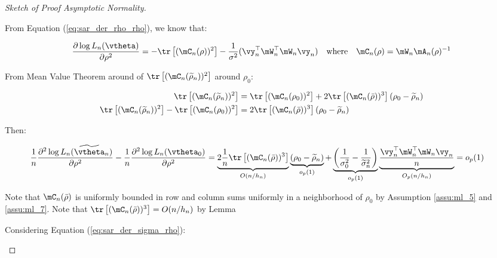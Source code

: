 \documentclass[english,12pt]{book}\usepackage[]{graphicx}\usepackage[]{xcolor}
\begin{document}
\begin{proof}[Sketch of Proof Asymptotic Normality]
\begin{enumerate}
   From Equation (\ref{eq:sar_der_rho_rho}), we know that:
   
   \begin{equation*}
   \frac{\partial \log L_n(\vtheta) }{\partial \rho ^2} = - \tr\left[(\mC_n(\rho))^2\right] - \frac{1}{\sigma^2}(\vy_n^{\top}\mW^{\top}_n\mW_n\vy_n)\quad \mbox{where}\quad \mC_n(\rho) = \mW_n\mA_n(\rho)^{-1}
   \end{equation*}
   
   From Mean Value Theorem around of  $\tr\left[(\mC_n(\widetilde{\rho}_n))^2\right]$ around $\rho_0$:
   
   \begin{equation*}
    \begin{aligned}
    \tr\left[(\mC_n(\widetilde{\rho}_n))^2\right] & = \tr\left[(\mC_n(\rho_0))^2\right]+ 2\tr\left[(\mC_n(\bar{\rho}))^3\right](\rho_0 - \widetilde{\rho}_n) \\
    \tr\left[(\mC_n(\widetilde{\rho}_n))^2\right] - \tr\left[(\mC_n(\rho_0))^2\right] & = 2\tr\left[(\mC_n(\bar{\rho}))^3\right](\rho_0 - \widetilde{\rho}_n)
    \end{aligned}
   \end{equation*}
   
   Then:
   
   \begin{equation*}
    \begin{aligned}
    \frac{1}{n}\frac{\partial^2 \log L_n(\widetilde{\vtheta}_n)}{\partial \rho^2} - \frac{1}{n}\frac{\partial^2 \log L_n(\vtheta_0)}{\partial\rho^2} & = \underbrace{2\frac{1}{n}\tr\left[(\mC_n(\bar{\rho}))^3\right]}_{O(n/h_n)} \underbrace{(\rho_0 - \widetilde{\rho}_n)}_{o_p(1)} + \underbrace{\left(\frac{1}{\sigma^2_0} - \frac{1}{\widetilde{\sigma}^2_n}\right)}_{o_p(1)}\underbrace{\frac{\vy_n^{\top}\mW^{\top}_n\mW_n\vy_n}{n}}_{O_p(n/h_n)} = o_p(1)
    \end{aligned}
   \end{equation*}
   
   Note that $\mC_n(\bar{\rho})$ is uniformly bounded in row and column sums uniformly in a neighborhood of $\rho_0$ by  Assumption \ref{assu:ml_5} and \ref{assu:ml_7}. Note that $\tr\left[(\mC_n(\bar{\rho}))^3\right] = O(n/h_n)$ by Lemma 
   
  Considering Equation (\ref{eq:sar_der_sigma_rho}):
   

\end{enumerate}
\end{proof}
\end{document}
